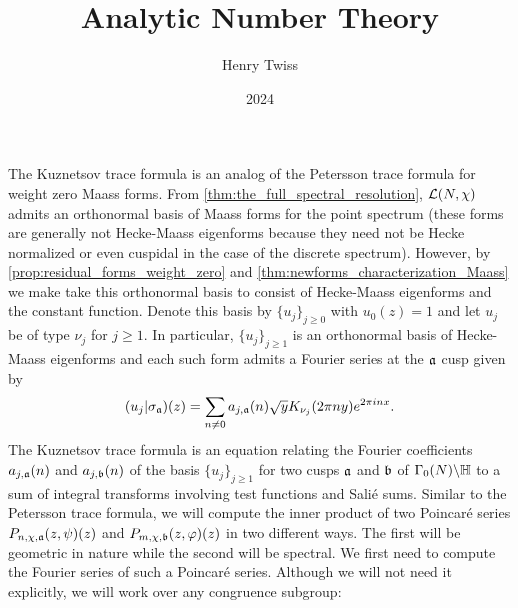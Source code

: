 \documentclass[12pt,oneside]{book}
\title{Analytic Number Theory}
\author{Henry Twiss}
\date{2024}
\begin{document}
  \section{}
    The Kuznetsov trace formula is an analog of the Petersson trace formula for weight zero Maass forms. From \cref{thm:the_full_spectral_resolution}, $\mathcal{L}(N,\chi)$ admits an orthonormal basis of Maass forms for the point spectrum (these forms are generally not Hecke-Maass eigenforms because they need not be Hecke normalized or even cuspidal in the case of the discrete spectrum). However, by \cref{prop:residual_forms_weight_zero} and \cref{thm:newforms_characterization_Maass} we make take this orthonormal basis to consist of Hecke-Maass eigenforms and the constant function. Denote this basis by $\{u_{j}\}_{j \ge 0}$ with $u_{0}(z) = 1$ and let $u_{j}$ be of type $\nu_{j}$ for $j \ge 1$. In particular, $\{u_{j}\}_{j \ge 1}$ is an orthonormal basis of Hecke-Maass eigenforms and each such form admits a Fourier series at the $\mathfrak{a}$ cusp given by
    \[
      (u_{j}|\sigma_{\mathfrak{a}})(z) = \sum_{n \neq 0}a_{j,\mathfrak{a}}(n)\sqrt{y}K_{\nu_{j}}(2\pi ny)e^{2\pi inx}.
    \]
    The Kuznetsov trace formula is an equation relating the Fourier coefficients $a_{j,\mathfrak{a}}(n)$ and $a_{j,\mathfrak{b}}(n)$ of the basis $\{u_{j}\}_{j \ge 1}$ for two cusps $\mathfrak{a}$ and $\mathfrak{b}$ of $\Gamma_{0}(N)\backslash\mathbb{H}$ to a sum of integral transforms involving test functions and Sali\'e sums. Similar to the Petersson trace formula, we will compute the inner product of two Poincar\'e series $P_{n,\chi,\mathfrak{a}}(z,\psi)(z)$ and $P_{m,\chi,\mathfrak{b}}(z,\varphi)(z)$ in two different ways. The first will be geometric in nature while the second will be spectral. We first need to compute the Fourier series of such a Poincar\'e series. Although we will not need it explicitly, we will work over any congruence subgroup:
\end{document}
